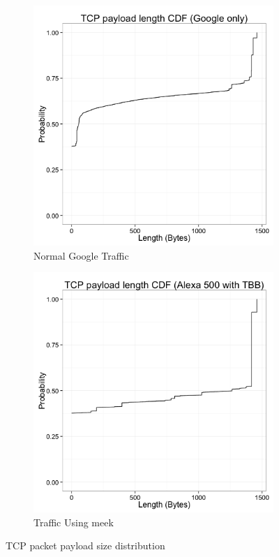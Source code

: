\documentclass{article}
\begin{document}
\begin{figure}
\centering
\begin{subfigure}[b]{0.5\textwidth}
\includegraphics[width=\textwidth]{figs/datalen-google-cdf.png}
\caption{Normal Google Traffic}
\label{fig:len:lbl}
\end{subfigure}%
\begin{subfigure}[b]{0.5\textwidth}
\includegraphics[width=\textwidth]{figs/datalen-tbb-cdf.png}
\caption{Traffic Using meek}
\label{fig:len:meek}
\end{subfigure}

\caption{TCP packet payload size distribution}
\label{fig:len}
\end{figure}
\end{document}
